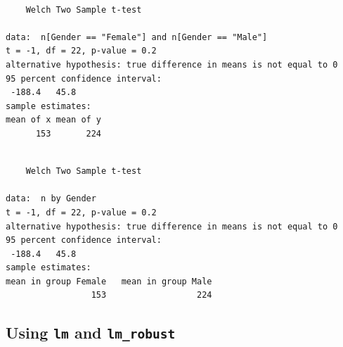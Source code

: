\documentclass[]{book}
\newenvironment{Shaded}{\begin{snugshade}}{\end{snugshade}}
\newcommand{\CommentTok}[1]{\textcolor[rgb]{0.56,0.35,0.01}{\textit{#1}}}
\newcommand{\KeywordTok}[1]{\textcolor[rgb]{0.13,0.29,0.53}{\textbf{#1}}}
\newcommand{\NormalTok}[1]{#1}
\newcommand{\OperatorTok}[1]{\textcolor[rgb]{0.81,0.36,0.00}{\textbf{#1}}}
\newcommand{\StringTok}[1]{\textcolor[rgb]{0.31,0.60,0.02}{#1}}
\begin{document}
\begin{Shaded}
\end{Shaded}

\begin{verbatim}

    Welch Two Sample t-test

data:  n[Gender == "Female"] and n[Gender == "Male"]
t = -1, df = 22, p-value = 0.2
alternative hypothesis: true difference in means is not equal to 0
95 percent confidence interval:
 -188.4   45.8
sample estimates:
mean of x mean of y 
      153       224 
\end{verbatim}

\begin{Shaded}
\end{Shaded}

\begin{verbatim}

    Welch Two Sample t-test

data:  n by Gender
t = -1, df = 22, p-value = 0.2
alternative hypothesis: true difference in means is not equal to 0
95 percent confidence interval:
 -188.4   45.8
sample estimates:
mean in group Female   mean in group Male 
                 153                  224 
\end{verbatim}

\hypertarget{using-lm-and-lm_robust}{%
\subsection{\texorpdfstring{Using \texttt{lm} and \texttt{lm\_robust}}{Using lm and lm\_robust}}\label{using-lm-and-lm_robust}}

\begin{Shaded}
\end{Shaded}
\end{document}
